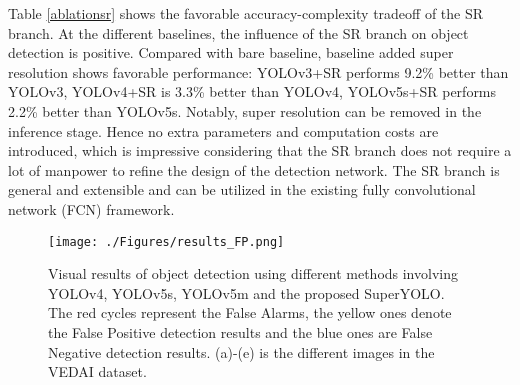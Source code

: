 Table \ref{ablationsr} shows the favorable accuracy-complexity tradeoff of the SR branch. At the different baselines, the influence of the SR branch on object detection is positive. Compared with bare baseline, baseline added super resolution shows favorable performance: YOLOv3+SR performs  9.2\% better than YOLOv3, YOLOv4+SR is  3.3\% better than YOLOv4, YOLOv5s+SR performs  2.2\% better than YOLOv5s. Notably, super resolution can be removed in the inference stage. Hence no extra parameters and computation costs are introduced, which is impressive considering that the SR branch does not require a lot of manpower to refine the design of the detection network. The SR branch is general and extensible and can be utilized in the existing fully convolutional network (FCN) framework.


\begin{figure*}[htpb]
	\centering
	\texttt{[image: ./Figures/results\_FP.png]}
	\centering
	\caption{Visual results of object detection using different methods involving YOLOv4, YOLOv5s, YOLOv5m and the proposed SuperYOLO. The red cycles represent the False Alarms, the yellow ones denote the False Positive detection results and the blue ones are False Negative detection results. (a)-(e) is the different images in the VEDAI dataset.}
	\vspace{-0.1in}
	\label{results}
\end{figure*}
